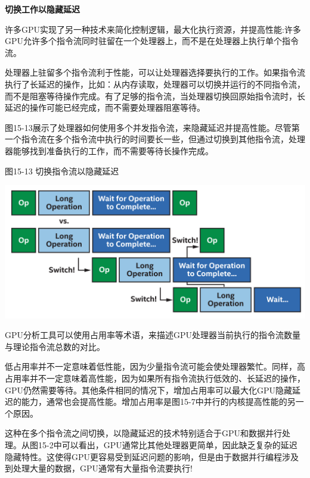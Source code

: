 \hspace*{\fill} \par %
\textbf{切换工作以隐藏延迟}

许多GPU实现了另一种技术来简化控制逻辑，最大化执行资源，并提高性能:许多GPU允许多个指令流同时驻留在一个处理器上，而不是在处理器上执行单个指令流。\par

处理器上驻留多个指令流利于性能，可以让处理器选择要执行的工作。如果指令流执行了长延迟的操作，比如：从内存读取，处理器可以切换并运行的不同指令流，而不是阻塞等待操作完成。有了足够的指令流，当处理器切换回原始指令流时，长延迟的操作可能已经完成，而不需要处理器阻塞等待。\par

图15-13展示了处理器如何使用多个并发指令流，来隐藏延迟并提高性能。尽管第一个指令流在多个指令流中执行的时间要长一些，但通过切换到其他指令流，处理器能够找到准备执行的工作，而不需要等待长操作完成。\par

\hspace*{\fill} \par %
图15-13 切换指令流以隐藏延迟
\begin{center}
	\includegraphics[width=1.0\textwidth]{content/chapter-15/images/9}
\end{center}

GPU分析工具可以使用占用率等术语，来描述GPU处理器当前执行的指令流数量与理论指令流总数的对比。\par

低占用率并不一定意味着低性能，因为少量指令流可能会使处理器繁忙。同样，高占用率并不一定意味着高性能，因为如果所有指令流执行低效的、长延迟的操作，GPU仍然需要等待。其他条件相同的情况下，增加占用率可以最大化GPU隐藏延迟的能力，通常也会提高性能。增加占用率是图15-7中并行的内核提高性能的另一个原因。\par

这种在多个指令流之间切换，以隐藏延迟的技术特别适合于GPU和数据并行处理。从图15-2中可以看出，GPU通常比其他处理器更简单，因此缺乏复杂的延迟隐藏特性。这使得GPU更容易受到延迟问题的影响，但是由于数据并行编程涉及到处理大量的数据，GPU通常有大量指令流要执行!\par














